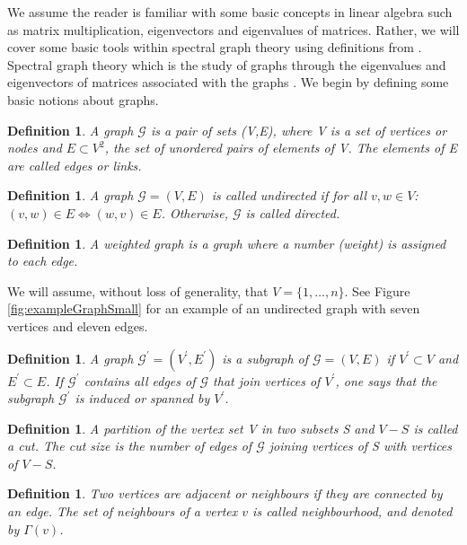 \documentclass[12pt]{article}
\numberwithin{equation}{section}
\newtheorem{definition}[theorem]{Definition}
\begin{document}
We assume the reader is familiar with some basic concepts in linear algebra such as matrix multiplication, eigenvectors and eigenvalues of matrices. Rather, we will cover some basic tools within spectral graph theory using definitions from \cite{For10,New06a, Spi12, Spi07}. Spectral graph theory which is the study of graphs through the eigenvalues and eigenvectors of matrices associated with the graphs \cite{Spi12}. We begin by defining some basic notions about graphs.
\begin{definition}
\label{def:graph}
	A graph $\mathcal{G}$ is a pair of sets (V,E), where V is a set of vertices or nodes and $E \subset V^{2}$, the set of unordered pairs of elements of V. The elements of E are called edges or links.
\end{definition}
\begin{definition}
\label{def:undirectedGraph}
	A graph $\mathcal{G} = (V,E)$ is called undirected if for all $v,w \in V$: $(v,w) \in E \iff (w,v) \in E$. Otherwise, $\mathcal{G}$ is called directed.
\end{definition}
\begin{definition}
\label{def:weightedGraph}
	A weighted graph is a graph where a number (weight) is assigned to each edge.
\end{definition}
We will assume, without loss of generality, that $V = \{1,\dots,n\}$. See Figure \ref{fig:exampleGraphSmall} for an example of an undirected graph with seven vertices and eleven edges.
\begin{definition}
\label{def:subGraph}
	A graph $\mathcal{G}^{\prime} = (V^{\prime},E^{\prime})$ is a subgraph of $\mathcal{G} = (V,E)$ if $V^{\prime} \subset V$ and $E^{\prime} \subset E$. If $\mathcal{G}^{\prime}$ contains all edges of $\mathcal{G}$ that join vertices of $V^{\prime}$, one says that the subgraph $\mathcal{G}^{\prime}$ is induced or spanned by $V^{\prime}$.
\end{definition}
\begin{definition}
\label{def:cuts}
	A partition of the vertex set V in two subsets S and $V-S$ is called a cut. The cut size is the number of edges of $\mathcal{G}$ joining vertices of S with vertices of $V-S$.
\end{definition}
\begin{definition}
\label{def:neighbourhoodNode}
	Two vertices are adjacent or neighbours if they are connected by an edge. The set of neighbours of a vertex $v$ is called neighbourhood, and denoted by $\Gamma(v)$.
\end{definition}
\end{document}

